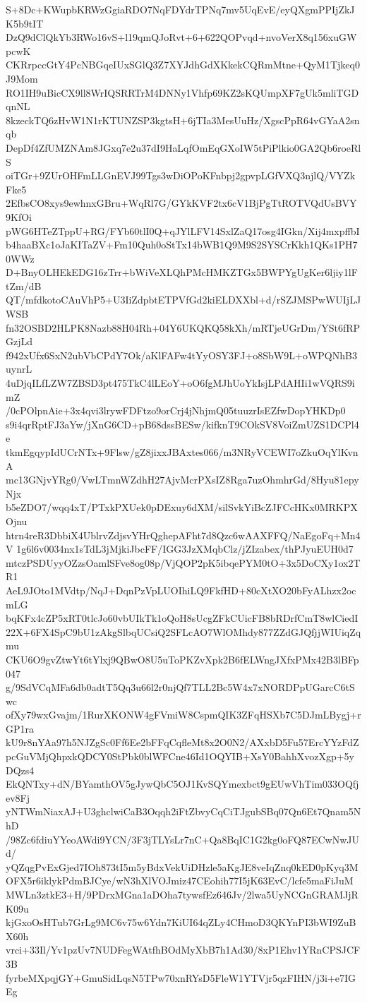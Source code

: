 S+8Dc+KWupbKRWzGgiaRDO7NqFDYdrTPNq7mv5UqEvE/eyQXgmPPIjZkJK5b9tIT
DzQ9dClQkYb3RWo16vS+l19qmQJoRvt+6+622QOPvqd+nvoVerX8q156xuGWpcwK
CKRrpccGtY4PcNBGqeIUxSGlQ3Z7XYJdhGdXKkekCQRmMtne+QyM1Tjkeq0J9Mom
RO1IH9uBicCX9ll8WrIQSRRTrM4DNNy1Vhfp69KZ2sKQUmpXF7gUk5mliTGDqnNL
8kzeckTQ6zHvW1N1rKTUNZSP3kgtsH+6jTIa3MesUuHz/XgscPpR64vGYaA2snqb
DepDf4ZfUMZNAm8JGxq7e2u37dI9HaLqfOmEqGXoIW5tPiPlkio0GA2Qb6roeRlS
oiTGr+9ZUrOHFmLLGnEVJ99Tgs3wDiOPoKFnbpj2gpvpLGfVXQ3njlQ/VYZkFke5
2EfbsCO8xys9ewhnxGBru+WqRl7G/GYkKVF2tx6cV1BjPgTtROTVQdUsBVY9KfOi
pWG6HTeZTppU+RG/FYb60tlI0Q+qJYlLFV14SxlZaQ17osg4IGkn/Xij4mxpffbI
b4haaBXc1oJaKITaZV+Fm10Quh0oStTx14bWB1Q9M9S2SYSCrKkh1QKs1PH70WWz
D+BnyOLHEkEDG16zTrr+bWiVeXLQhPMcHMKZTGx5BWPYgUgKer6ljiy1lFtZm/dB
QT/mfdkotoCAuVhP5+U3IiZdpbtETPVfGd2kiELDXXbl+d/rSZJMSPwWUIjLJWSB
fn32OSBD2HLPK8Nazb88H04Rh+04Y6UKQKQ58kXh/mRTjeUGrDm/YSt6fRPGzjLd
f942xUfx6SxN2ubVbCPdY7Ok/aKlFAFw4tYyOSY3FJ+o8SbW9L+oWPQNhB3uynrL
4uDjqILfLZW7ZBSD3pt475TkC4lLEoY+oO6fgMJhUoYkIsjLPdAHIi1wVQRS9imZ
/0cPOlpnAie+3x4qvi3lrywFDFtzo9orCrj4jNhjmQ05tuuzrIsEZfwDopYHKDp0
s9i4qrRptFJ3aYw/jXnG6CD+pB68dssBESw/kifknT9COkSV8VoiZmUZS1DCPl4e
tkmEgqypIdUCrNTx+9Flsw/gZ8jixxJBAxtes066/m3NRyVCEWI7oZkuOqYlKvnA
mc13GNjvYRg0/VwLTmnWZdhH27AjvMcrPXsIZ8Rga7uzOhmhrGd/8Hyu81epyNjx
b5eZDO7/wqq4xT/PTxkPXUek0pDExuy6dXM/silSvkYiBcZJFCcHKx0MRKPXOjnu
htrn4reR3DbbiX4UblrvZdjsvYHrQghepAFht7d8Qzc6wAAXFFQ/NaEgoFq+Mn4V
1g6l6v0034nx1sTdL3jMjkiJbcFF/IGG3JzXMqbClz/jZIzabex/thPJyuEUH0d7
mtczPSDUyyOZzsOamlSFve8og08p/VjQOP2pK5ibqePYM0tO+3x5DoCXy1ox2TR1
AeL9JOto1MVdtp/NqJ+DqnPzVpLUOIhiLQ9FkfHD+80cXtXO20bFyALhzx2ocmLG
bqKFx4cZP5xRT0tlcJo60vbUIkTk1oQoH8sUcgZFkCUicFB8bRDrfCmT8wlCiedI
22X+6FX4SpC9bU1zAkgSlbqUCsiQ2SFLcAO7WlOMhdy877ZZdGJQfjjWIUiqZqmu
CKU6O9gvZtwYt6tYlxj9QBwO8U5uToPKZvXpk2B6fELWngJXfxPMx42B3lBFp047
g/9SdVCqMFa6db0adtT5Qq3u66l2r0njQf7TLL2Bc5W4x7xNORDPpUGarcC6tSwc
ofXy79wxGvajm/1RurXKONW4gFVmiW8CspmQIK3ZFqHSXb7C5DJmLBygj+rGP1ra
kU9r8nYAa97h5NJZgSc0Ff6Ee2bFFqCqfleMt8x2O0N2/AXxbD5Fu57ErcYYzFdZ
pcGuVMjQhpxkQDCY0StPbk0blWFCne46Id1OQYIB+XsY0BahhXvozXgp+5yDQzs4
EkQNTxy+dN/BYamthOV5gJywQbC5OJ1KvSQYmexbct9gEUwVhTim033OQfjev8Fj
yNTWmNiaxAJ+U3ghclwiCaB3Oqqh2iFtZbvyCqCiTJgubSBq07Qn6Et7Qnam5NhD
/98Zc6fdiuYYeoAWdi9YCN/3F3jTLYsLr7nC+Qa8BqIC1G2kg0oFQ87ECwNwJUd/
yQZqgPvExGjed7IOh873tI5m5yBdxVekUiDHzle5aKgJE8veIqZnq0kED0pKyq3M
OFX5r6iklykPdmBJCye/wN3hXlVOJmiz47CEohih77I5jK63EvC/lcfe5maFiJuM
MWLn3ztkE3+H/9PDrxMGna1aDOha7tywsfEz646Jv/2lwa5UyNCGnGRAMJjRK09u
kjGxoOsHTub7GrLg9MC6v75w6Ydn7KiUI64qZLy4CHmoD3QKYnPI3bWI9ZuBX60h
vrci+33Il/Yv1pzUv7NUDFegWAtfhBOdMyXbB7h1Ad30/8xP1Ehv1YRnCPSJCF3B
fyrbeMXpqjGY+GmuSidLqsN5TPw70xnRYsD5FleW1YTVjr5qzFIHN/j3i+e7IGEg
